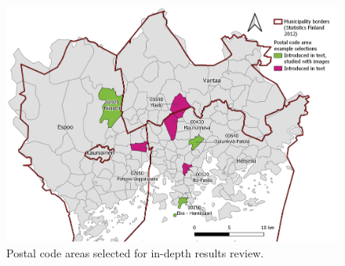 \begin{figure}[H]%
    \centering
    \includegraphics[trim={0 0.2cm 0 0},clip,width=\textwidth]{images/results_comparison_examplezips.png}
    \caption[Postal code areas selected for in-depth results review]{Postal code areas selected for in-depth results review.}%
    \label{fig:ykrzone_selections_map}%
\end{figure}

